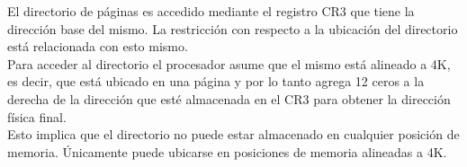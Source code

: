 El directorio de páginas es accedido mediante el registro CR3 que tiene la dirección base del mismo. La restricción con respecto a la ubicación del directorio está relacionada con esto mismo.\\
Para acceder al directorio el procesador asume que el mismo está alineado a 4K, es decir, que está ubicado en una página y por lo tanto agrega 12 ceros a la derecha de la dirección que esté almacenada en el CR3 para obtener la dirección física final.\\

Esto implica que el directorio no puede estar almacenado en cualquier posición de memoria. Únicamente puede ubicarse en posiciones de memoria alineadas a 4K.